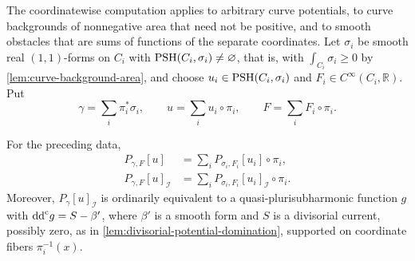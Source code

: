 The coordinatewise computation applies to arbitrary curve potentials, to curve backgrounds of nonnegative area that need not be positive, and to smooth obstacles that are sums of functions of the separate coordinates. Let $\sigma_i$ be smooth real $(1,1)$-forms on $C_i$ with $\mathrm{PSH}(C_i,\sigma_i)\ne\varnothing$, that is, with $\int_{C_i}\sigma_i\geq0$ by \cref{lem:curve-background-area}, and choose $u_i\in\mathrm{PSH}(C_i,\sigma_i)$ and $F_i\in C^\infty(C_i,\mathbb R)$. Put
\[
 \gamma=\sum_i\pi_i^*\sigma_i,\qquad
 u=\sum_i u_i\circ\pi_i,\qquad
 F=\sum_i F_i\circ\pi_i.
\]

\begin{proposition}\label{prop:separated-curve-obstacle-projections}\label{lem:separated-curve-model-projections}
For the preceding data,
\begin{equation}\label{eq:separated-curve-obstacle-projections}
 \begin{aligned}
 P_{\gamma,F}[u]
     &=\sum_i P_{\sigma_i,F_i}[u_i]\circ\pi_i,\\
 P_{\gamma,F}[u]_{\mathcal I}
     &=\sum_i P_{\sigma_i,F_i}[u_i]_{\mathcal I}\circ\pi_i.
 \end{aligned}
\end{equation}
Moreover, $P_\gamma[u]_{\mathcal I}$ is ordinarily equivalent to a quasi-plurisubharmonic function $g$ with $\mathrm{dd}^{\mathrm{c}} g=S-\beta'$, where $\beta'$ is a smooth form and $S$ is a divisorial current, possibly zero, as in \cref{lem:divisorial-potential-domination}, supported on coordinate fibers $\pi_i^{-1}(x)$.
\end{proposition}
